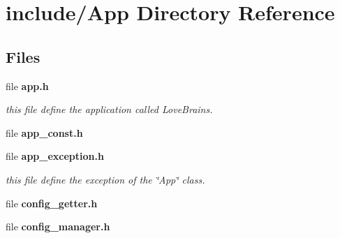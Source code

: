 \section{include/\+App Directory Reference}
\label{dir_642367913842c014a12dbaecbb53dbe5}
\subsection*{Files}
\begin{DoxyCompactItemize}
\item 
file {\bf app.\+h}
\begin{DoxyCompactList}\small\item\em this file define the application called Love\+Brains. \end{DoxyCompactList}\item 
file {\bfseries app\+\_\+const.\+h}
\item 
file {\bf app\+\_\+exception.\+h}
\begin{DoxyCompactList}\small\item\em this file define the exception of the \char`\"{}\+App\char`\"{} class. \end{DoxyCompactList}\item 
file {\bfseries config\+\_\+getter.\+h}
\item 
file {\bfseries config\+\_\+manager.\+h}
\end{DoxyCompactItemize}
